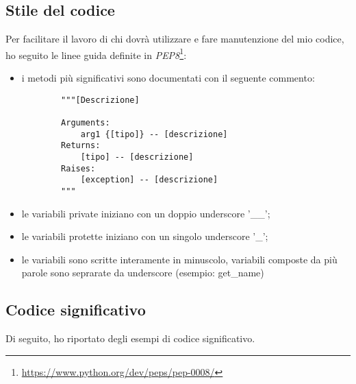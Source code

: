 \subsection{Stile del codice}
Per facilitare il lavoro di chi dovrà utilizzare e fare manutenzione del mio codice, ho seguito le linee guida definite in \textit{PEP8}\footnote{\url{https://www.python.org/dev/peps/pep-0008/}}:
\begin{itemize}
    \item i metodi più significativi sono documentati con il seguente commento:
    \begin{lstlisting}
        """[Descrizione]

        Arguments:
            arg1 {[tipo]} -- [descrizione]
        Returns:
            [tipo] -- [descrizione]
        Raises:
            [exception] -- [descrizione]
        """
    \end{lstlisting}
    \item le variabili private iniziano con un doppio underscore '\_\_';
    \item le variabili protette iniziano con un singolo underscore '\_';
    \item le variabili sono scritte interamente in minuscolo, variabili composte da più parole sono seprarate da underscore (esempio: get\_name)
\end{itemize}

\subsection{Codice significativo}

Di seguito, ho riportato degli esempi di codice significativo.
